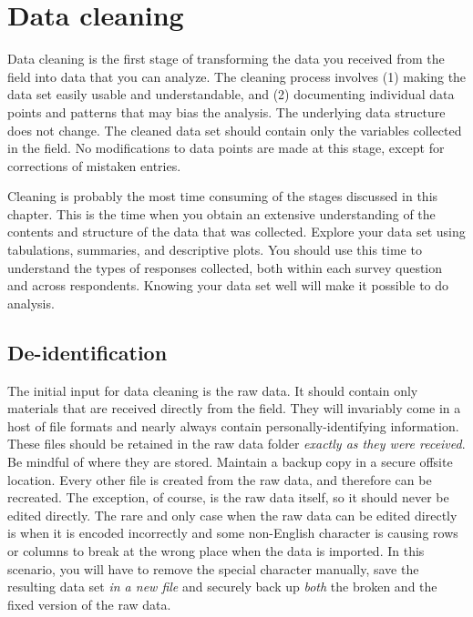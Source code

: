 
\section{Data cleaning}

Data cleaning is the first stage of transforming the data you received from the field into data that you can analyze.
The cleaning process involves (1) making the data set easily usable and understandable, 
and (2) documenting individual data points and patterns that may bias the analysis.
The underlying data structure does not change.
The cleaned data set should contain only the variables collected in the field.
No modifications to data points are made at this stage, except for corrections of mistaken entries.

Cleaning is probably the most time consuming of the stages discussed in this chapter.
This is the time when you obtain an extensive understanding of  the contents and structure of the data that was collected.
Explore your data set using tabulations, summaries, and descriptive plots.
You should use this time to understand the types of responses collected, both within each survey question and across respondents.
Knowing your data set well will make it possible to do analysis.

\subsection{De-identification}

The initial input for data cleaning is the raw data.
It should contain only materials that are received directly from the field.
They will invariably come in a host of file formats and nearly always contain personally-identifying information.
These files should be retained in the raw data folder \textit{exactly as they were received}.
Be mindful of where they are stored. 
Maintain a backup copy in a secure offsite location.
Every other file is created from the raw data, and therefore can be recreated.
The exception, of course, is the raw data itself, so it should never be edited directly.
The rare and only case when the raw data can be edited directly is when it is encoded incorrectly
and some non-English character is causing rows or columns to break at the wrong place
when the data is imported. 
In this scenario, you will have to remove the special character manually, save the resulting data set \textit{in a new file} and securely back up \textit{both} the broken and the fixed version of the raw data.

